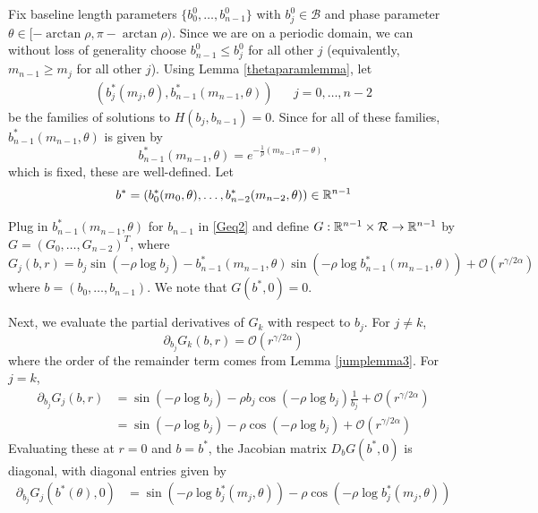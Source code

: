 \documentclass[thesis.tex]{subfiles}
\begin{document}
Fix baseline length parameters $\{ b_0^0, \dots, b_{n-1}^0 \}$ with $b_j^0 \in \mathcal{B}$ and phase parameter $\theta \in [-\arctan \rho, \pi - \arctan \rho)$. Since we are on a periodic domain, we can without loss of generality choose $b_{n-1}^0 \leq b_j^0$ for all other $j$ (equivalently, $m_{n-1} \geq m_j$ for all other $j$). Using Lemma \ref{thetaparamlemma}, let
\begin{align*}
(b_j^*(m_j, \theta), b_{n-1}^*(m_{n-1}, \theta)) && j = 0, \dots, n-2
\end{align*}
be the families of solutions to $H(b_j, b_{n-1}) = 0$. Since for all of these families, $b_{n-1}^*(m_{n-1}, \theta)$ is given by
\begin{equation}\label{bstarlast}
b_{n-1}^*(m_{n-1}, \theta) = e^{-\frac{1}{\rho}(m_{n-1}\pi - \theta)},
\end{equation}
which is fixed, these are well-defined. Let
\[
b^* = (b_0^*(m_0, \theta), \dots, b_{n-2}^*(m_{n-2}, \theta) ) \in \mathbb{R}^{n-1}
\]

Plug in $b_{n-1}^*(m_{n-1}, \theta)$ for $b_{n-1}$ in \eqref{Geq2} and define $G: \mathbb{R}^{n-1} \times \mathcal{R} \rightarrow \mathbb{R}^{n-1}$ by $G = (G_0, \dots, G_{n-2})^T$, where 
\begin{equation*}
G_j(b, r) = b_j \sin \left( -\rho \log b_j \right) - b_{n-1}^*(m_{n-1}, \theta) \sin \left( -\rho \log b_{n-1}^*(m_{n-1}, \theta) \right) + \mathcal{O}(r^{\gamma / 2 \alpha})
\end{equation*}
where $b = (b_0, \dots, b_{n-1})$. We note that $G(b^*, 0) = 0$.

Next, we evaluate the partial derivatives of $G_k$ with respect to $b_j$. For $j \neq k$, 
\[
\partial_{b_j} G_k(b, r) = \mathcal{O}(r^{\gamma/2\alpha})
\]
where the order of the remainder term comes from Lemma \ref{jumplemma3}. For $j = k$, 
\begin{align*}
\partial_{b_j} G_j(b, r) &= 
\sin \left( -\rho \log b_j \right) - \rho b_j \cos \left( -\rho \log b_j \right) \frac{1}{b_j} + \mathcal{O}(r^{\gamma/2\alpha}) \\
&= \sin \left( -\rho \log b_j \right) - \rho \cos \left( -\rho \log b_j \right) + \mathcal{O}(r^{\gamma/2\alpha}) 
\end{align*}
Evaluating these at $r = 0$ and $b = b^*$, the Jacobian matrix $D_b G(b^*,0)$ is diagonal, with diagonal entries given by 
\begin{align*}
\partial_{b_j} G_j(b^*(\theta), 0)
&= \sin \left( -\rho \log b_j^*(m_j, \theta) \right) - \rho \cos \left( -\rho \log b_j^*(m_j, \theta) \right)
\end{align*}
\end{document}
